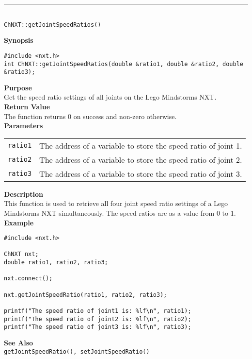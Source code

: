 \noindent
\vspace{5pt}
\rule{4.5in}{0.015in}\\
\noindent
{\LARGE \texttt{ChNXT::getJointSpeedRatios()}}\\
{}

\noindent
{\bf Synopsis}
\vspace{-8pt}
\begin{verbatim}
#include <nxt.h>
int ChNXT::getJointSpeedRatios(double &ratio1, double &ratio2, double &ratio3);
\end{verbatim}

\noindent
{\bf Purpose}\\
Get the speed ratio settings of all joints on the Lego Mindstorms NXT.\\

\noindent
{\bf Return Value}\\
The function returns 0 on success and non-zero otherwise.\\

\noindent
{\bf Parameters}
\vspace{-0.1in}
\begin{description}
\item               
\begin{tabular}{p{10 mm}p{145 mm}}
\texttt{ratio1} & The address of a variable to store the speed ratio of joint 1.\\
\texttt{ratio2} & The address of a variable to store the speed ratio of joint 2.\\
\texttt{ratio3} & The address of a variable to store the speed ratio of joint 3.\\
\end{tabular}
\end{description}

\noindent
{\bf Description}\\
This function is used to retrieve all four joint speed ratio settings of a Lego
Mindstorms NXT simultaneously. The speed ratios are as a value from 0 to 1. \\

\noindent
{\bf Example}\\
\begin{verbatim}
#include <nxt.h>

ChNXT nxt;
double ratio1, ratio2, ratio3;

nxt.connect();

nxt.getJointSpeedRatio(ratio1, ratio2, ratio3);

printf("The speed ratio of joint1 is: %lf\n", ratio1);
printf("The speed ratio of joint2 is: %lf\n", ratio2);
printf("The speed ratio of joint3 is: %lf\n", ratio3);
\end{verbatim}

\noindent
{\bf See Also}\\
\texttt{getJointSpeedRatio(), setJointSpeedRatio()}

